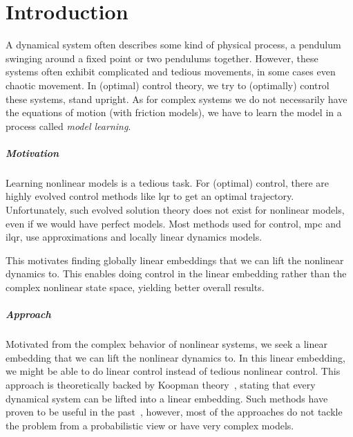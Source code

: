 \chapter{Introduction}
\label{c:introduction}



A dynamical system often describes some kind of physical process, \eg a pendulum swinging around a fixed point or two pendulums together. However, these systems often exhibit complicated and tedious movements, in some cases even chaotic movement. In (optimal) control theory, we try to (optimally) control these systems, \eg stand upright. As for complex systems we do not necessarily have the equations of motion (\eg with friction models), we have to learn the model in a process called \emph{model learning}.

\paragraph{Motivation}
	Learning nonlinear models is a tedious task. For (optimal) control, there are highly evolved control methods like \ac{lqr} to get an optimal trajectory. Unfortunately, such evolved solution theory does not exist for nonlinear models, even if we would have perfect models. Most methods used for control, \eg \ac{mpc} and \ac{ilqr}, use approximations and locally linear dynamics models.

	This motivates finding globally linear embeddings that we can lift the nonlinear dynamics to. This enables doing control in the linear embedding rather than the complex nonlinear state space, yielding better overall results.

\paragraph{Approach}
	Motivated from the complex behavior of nonlinear systems, we seek a linear embedding that we can lift the nonlinear dynamics to. In this linear embedding, we might be able to do linear control instead of tedious nonlinear control. This approach is theoretically backed by Koopman theory~\cite{koopmanHamiltonianSystemsTransformation1931}, stating that every dynamical system can be lifted into a linear embedding. Such methods have proven to be useful in the past~\cite{kaiserDatadrivenDiscoveryKoopman2020,hanDeepLearningKoopman2020,mortonDeepVariationalKoopman2019a}, however, most of the approaches do not tackle the problem from a probabilistic view or have very complex models.

